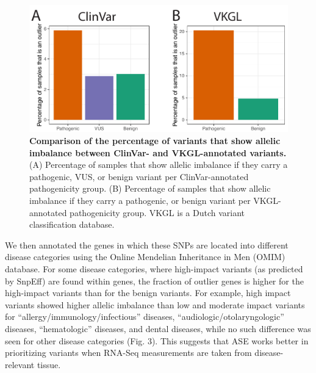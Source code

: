 \begin{figure}[h!]
	\includegraphics[scale=0.1]{chapters/chapter3-allele-specific-expression/img/fig2.pdf}
	\caption{\textbf{Comparison of the percentage of variants that show allelic imbalance between ClinVar- and VKGL-annotated variants.} (A) Percentage of samples that show allelic imbalance if they carry a pathogenic, VUS, or benign variant per ClinVar-annotated pathogenicity group. (B) Percentage of samples that show allelic imbalance if they carry a pathogenic, or benign variant per VKGL-annotated pathogenicity group. VKGL is a Dutch variant classification database. }
\end{figure}


We then annotated the genes in which these SNPs are located into different disease categories using the Online Mendelian Inheritance in Men (OMIM) database\cite{hamoshOnlineMendelianInheritance2000}. For some disease categories, where high-impact variants (as predicted by SnpEff\cite{cingolaniProgramAnnotatingPredicting2012}) are found within genes, the fraction of outlier genes is higher for the high-impact variants than for the benign variants. For example, high impact variants showed higher allelic imbalance than low and moderate impact variants for “allergy/immunology/infectious” diseases, “audiologic/otolaryngologic” diseases, “hematologic” diseases, and dental diseases, while no such difference was seen for other disease categories (Fig. 3). This suggests that ASE works better in prioritizing variants when RNA-Seq measurements are taken from disease-relevant tissue. 

